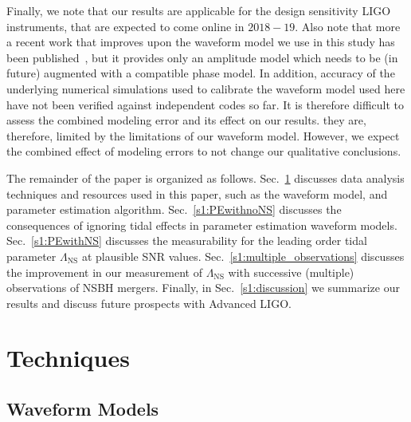 \documentclass[aps,prd,amsmath,floats,floatfix, twocolumn,
superscriptaddress,nofootinbib,showpacs]{revtex4-1}
\newcommand{\lambdans}{\Lambda_\mathrm{NS}}
\begin{document}
Finally, we note that our results are applicable for the design sensitivity
LIGO instruments, that are expected to come online in $2018-19$. Also note
that more a recent work that improves upon the waveform model we use in this
study has been published~\cite{Pannarale:2015jka}, but it provides only an 
amplitude model which needs to be (in future) augmented with a compatible
phase model. In addition, accuracy of the underlying numerical simulations 
used to calibrate the waveform model used here have not been verified against 
independent codes so far.
It is therefore difficult to assess the combined modeling error and its effect
on our results. they are, therefore, limited by the limitations of our
waveform model. However, we expect the combined effect of modeling errors to
not change our qualitative conclusions.




The remainder of the paper is organized as follows. 
Sec.~\ref{s1:techniques} discusses data analysis techniques and resources 
used in this paper, such as the waveform model, and parameter estimation 
algorithm.
Sec.~\ref{s1:PEwithnoNS} discusses the consequences of ignoring tidal 
effects in parameter estimation waveform models.
Sec.~\ref{s1:PEwithNS} discusses the measurability for the leading order
tidal parameter $\lambdans$ at plausible SNR values.
Sec.~\ref{s1:multiple_observations} discusses the improvement in our
measurement of $\lambdans$ with successive (multiple) observations of
NSBH mergers.
Finally, in Sec.~\ref{s1:discussion} we summarize our results and discuss
future prospects with Advanced LIGO.





\section{Techniques}\label{s1:techniques}
\subsection{Waveform Models}\label{s2:waveforms}
\end{document}

